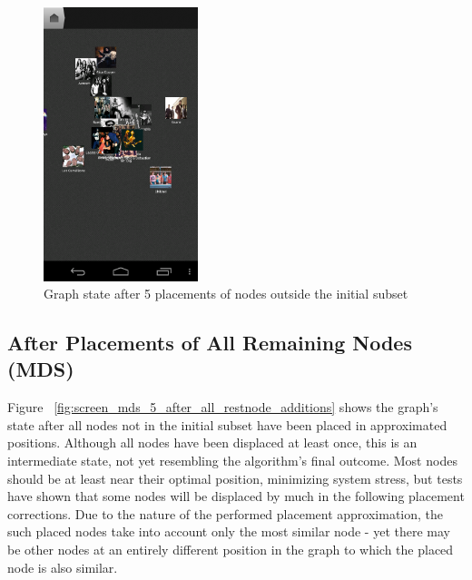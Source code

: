 \begin{figure}[H]
  \centering
    \includegraphics[width=0.4\textwidth]{figures/screen_mds_4_after_5_restnode_additions}
  \caption{Graph state after 5 placements of nodes outside the initial subset}
  \label{fig:screen_mds_4_after_5_restnode_additions}
\end{figure}

\newpage
\subsection{After Placements of All Remaining Nodes (MDS)}

Figure ~\ref{fig:screen_mds_5_after_all_restnode_additions} shows the graph's state after all nodes not in the initial subset have been placed in approximated positions. Although all nodes have been displaced at least once, this is an intermediate state, not yet resembling the algorithm's final outcome. Most nodes should be at least near their optimal position, minimizing system stress, but tests have shown that some nodes will be displaced by much in the following placement corrections. Due to the nature of the performed placement approximation, the such placed nodes take into account only the most similar node - yet there may be other nodes at an entirely different position in the graph to which the placed node is also similar.

